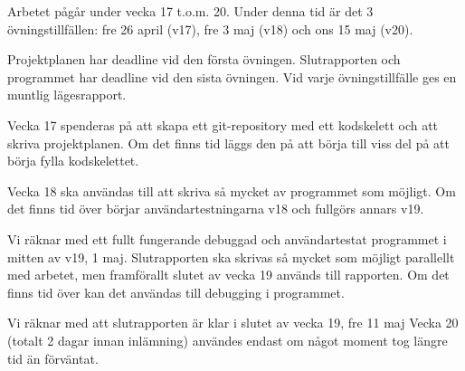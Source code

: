 Arbetet pågår under vecka 17 t.o.m. 20.
Under denna tid är det 3 övningstillfällen:
fre 26 april (v17),
fre 3 maj (v18) och
ons 15 maj (v20).

Projektplanen har deadline vid den första övningen.
Slutrapporten och programmet har deadline vid den sista övningen.
Vid varje övningstillfälle ges en muntlig lägesrapport.

Vecka 17 spenderas på att skapa ett git-repository med ett kodskelett och
att skriva projektplanen.
Om det finns tid läggs den på att börja till viss del på att börja
fylla kodskelettet.

Vecka 18 ska användas till att skriva så mycket av programmet som möjligt.
Om det finns tid över börjar användartestningarna v18 och fullgörs annars
v19.

Vi räknar med ett fullt fungerande debuggad och användartestat
programmet i mitten av v19, 1 maj.
Slutrapporten ska skrivas så mycket som möjligt parallellt
med arbetet, men framförallt slutet av vecka 19 används till rapporten.
Om det finns tid över kan det användas till debugging i programmet.

Vi räknar med att slutrapporten är klar i slutet av vecka 19, fre 11 maj
Vecka 20 (totalt 2 dagar innan inlämning) användes endast om något
moment tog längre tid än förväntat.
